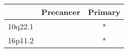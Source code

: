 \begin{tabular}{lcc}
\toprule
{} & Precancer & Primary \\
\midrule
10q22.1 &           &       * \\
16p11.2 &           &       * \\
\bottomrule
\end{tabular}
